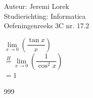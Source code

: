 \documentclass[a4paper]{article}
\begin{document}
  
\noindent \large Auteur: Jeremi Lorek\\
\noindent \large Studierichting: Informatica\\
\noindent \large Oefeningenreeks 3C nr. 17.2\\

\medskip
\normalsize

$\lim\limits_{x \to 0} \left( \dfrac{\tan x}{x} \right)$  \\

$\overset{H} = \lim\limits_{x \to 0} \left( \dfrac{1}{\cos^2 x} \right) $ \\

$= 1$  \\

\begin{thebibliography}{999}
\end{thebibliography}
\end{document}
